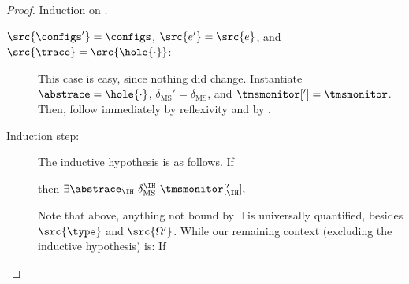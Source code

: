 \documentclass[a4paper,names,dvipsnames]{article}
\begin{document}
\begin{proof}
  Induction on .
  \begin{description}
    \item[$\src{\configs'}=\configs$, $\src{e'}=\src{e}$, and $\src{\trace}=\src{\hole{\cdot}}$:]
          This case is easy, since nothing did change.
          Instantiate $\abstrace=\hole{\cdot}$, $\delta_{\text{MS}}'=\delta_{\text{MS}}$, and $\tmsmonitor[']=\tmsmonitor$.
          Then,  follow immediately by reflexivity and  by .

    \item[Induction step:]
          The inductive hypothesis is as follows.
          If
          then $\exists \abstrace_{\IH}\ \delta_{\text{MS}}^{\IH}\ \tmsmonitor[_{\IH}'],$
          Note that above, anything not bound by $\exists$ is universally quantified, besides $\src{\type}$ and $\src{\Omega'}$.
          While our remaining context (excluding the inductive hypothesis) is:
          If
\end{description}
\end{proof}
\end{document}
